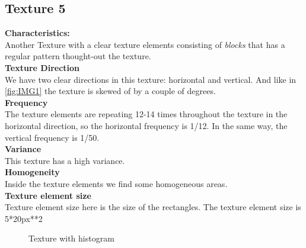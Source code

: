 \documentclass{article}
\begin{document}
\newpage
\subsection{Texture 5}
\textbf{Characteristics:}\\
Another Texture with a clear texture elements consisting of \textit{blocks} that has a regular pattern thought-out the texture.
\\

\textbf{Texture Direction}\\
We have two clear directions in this texture: horizontal and vertical. And like in \ref{fig:IMG1} the texture is skewed of by a couple of degrees.
\\ 
 
\textbf{Frequency} \\
The texture elements are repeating 12-14 times throughout the texture in the horizontal direction, so the horizontal frequency is 1/12. In the same way, the vertical frequency is 1/50. 
\\

\textbf{Variance}\\
This texture has a high variance.
\\

\textbf{Homogeneity}\\
Inside the texture elements we find some homogeneous areas.
\\

\textbf{Texture element size}\\
Texture element size here is the size of the rectangles. The texture element size is 5*20px**2 
\\

\begin{figure}[h]%
	\centering
    \qquad
    \caption{Texture with histogram}%
    \label{fig:IMG5}%
\end{figure}
\end{document}
